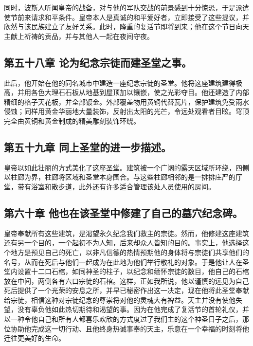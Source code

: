同时，波斯人听闻皇帝的战备，对与他的军队交战的前景感到十分惊恐，于是派遣使节前来请求和平条件。皇帝本人是真诚的和平爱好者，立即接受了这些提议，并欣然与该民族建立了友好关系。此时，隆重的复活节即将到来；他在这个节日向天主献上祈祷的贡品，并与其他人一起在夜间守夜。\par


\subsection{第五十八章 论为纪念宗徒而建圣堂之事。}

此后，他开始在他的同名城市中建造一座纪念宗徒的圣堂。他将这座建筑建得极高，并用各色大理石石板从地基到屋顶加以镶嵌，使之光彩夺目。他还建造了内部精细的格子天花板，并全部镀金。外部覆盖物用黄铜代替瓦片，保护建筑免受雨水侵蚀；同样用黄金华丽地大量装饰，反射出太阳的光芒，令远处观看者目眩。穹顶完全由黄铜和黄金制成的精美雕刻装饰环绕。\par


\subsection{第五十九章 同上圣堂的进一步描述。}

皇帝以如此壮丽的方式美化了这座圣堂。建筑被一个广阔的露天区域所环绕，四侧以柱廊为界，柱廊将区域和圣堂本身围合。与这些柱廊相邻的是一排排庄严的厅堂，带有浴室和散步道，此外还有许多适合管理该处人员使用的房间。\par


\subsection{第六十章 他也在该圣堂中修建了自己的墓穴纪念碑。}

皇帝奉献所有这些建筑，是渴望永久纪念我们救主的宗徒。然而，他修建这座建筑还有另一个目的，一个起初不为人知，后来却众人皆知的目的。事实上，他选择这个地方是预见自己的死亡，以非凡信德的热情预期他的身体将与宗徒们共享他们的名号，从而在死后与他们一起成为在此地为他们举行敬礼的对象。于是他让人在圣堂内设置十二口石棺，如同神圣的柱子，以纪念和缅怀宗徒的数目，他自己的石棺放在中间，两侧各有六口宗徒的石棺。这样，正如我所说，他以谨慎的远见为自己死后提供了一个光荣的安息之所，并早已秘密作出这一决定，现在他将此圣堂奉献给宗徒，相信这种对宗徒纪念的尊崇将对他的灵魂大有裨益。天主并没有使他失望，没有辜负他如此热切期待和渴望的事。因为在他完成了复活节的首轮礼仪，并以一种令他自己和所有人都喜乐欢欣的方式度过了我们主的这个神圣日子之后，那位协助他完成这一切行动、且他终身热诚事奉的天主，乐意在一个幸福的时刻将他迁往更美好的生命。\par

